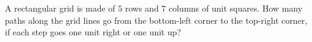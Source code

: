A rectangular grid is made of $5$ rows and $7$ columns of unit squares. How many paths along the grid lines go from the bottom-left corner to the top-right corner, if each step goes one unit right or one unit up?
